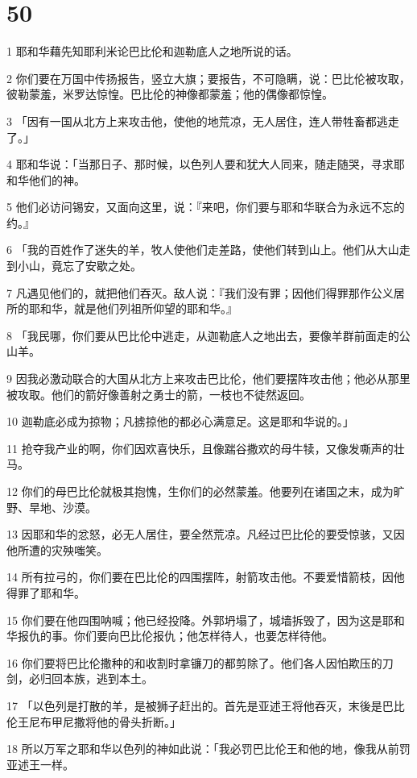 \chapter{50}

\par 1 耶和华藉先知耶利米论巴比伦和迦勒底人之地所说的话。
\par 2 你们要在万国中传扬报告，竖立大旗；要报告，不可隐瞒，说：巴比伦被攻取，彼勒蒙羞，米罗达惊惶。巴比伦的神像都蒙羞；他的偶像都惊惶。
\par 3 「因有一国从北方上来攻击他，使他的地荒凉，无人居住，连人带牲畜都逃走了。」
\par 4 耶和华说：「当那日子、那时候，以色列人要和犹大人同来，随走随哭，寻求耶和华他们的神。
\par 5 他们必访问锡安，又面向这里，说：『来吧，你们要与耶和华联合为永远不忘的约。』
\par 6 「我的百姓作了迷失的羊，牧人使他们走差路，使他们转到山上。他们从大山走到小山，竟忘了安歇之处。
\par 7 凡遇见他们的，就把他们吞灭。敌人说：『我们没有罪；因他们得罪那作公义居所的耶和华，就是他们列祖所仰望的耶和华。』
\par 8 「我民哪，你们要从巴比伦中逃走，从迦勒底人之地出去，要像羊群前面走的公山羊。
\par 9 因我必激动联合的大国从北方上来攻击巴比伦，他们要摆阵攻击他；他必从那里被攻取。他们的箭好像善射之勇士的箭，一枝也不徒然返回。
\par 10 迦勒底必成为掠物；凡掳掠他的都必心满意足。这是耶和华说的。」
\par 11 抢夺我产业的啊，你们因欢喜快乐，且像踹谷撒欢的母牛犊，又像发嘶声的壮马。
\par 12 你们的母巴比伦就极其抱愧，生你们的必然蒙羞。他要列在诸国之末，成为旷野、旱地、沙漠。
\par 13 因耶和华的忿怒，必无人居住，要全然荒凉。凡经过巴比伦的要受惊骇，又因他所遭的灾殃嗤笑。
\par 14 所有拉弓的，你们要在巴比伦的四围摆阵，射箭攻击他。不要爱惜箭枝，因他得罪了耶和华。
\par 15 你们要在他四围呐喊；他已经投降。外郭坍塌了，城墙拆毁了，因为这是耶和华报仇的事。你们要向巴比伦报仇；他怎样待人，也要怎样待他。
\par 16 你们要将巴比伦撒种的和收割时拿镰刀的都剪除了。他们各人因怕欺压的刀剑，必归回本族，逃到本土。
\par 17 「以色列是打散的羊，是被狮子赶出的。首先是亚述王将他吞灭，末後是巴比伦王尼布甲尼撒将他的骨头折断。」
\par 18 所以万军之耶和华以色列的神如此说：「我必罚巴比伦王和他的地，像我从前罚亚述王一样。
